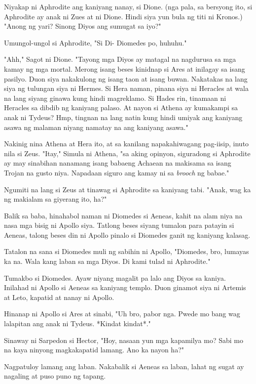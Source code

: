 \documentclass[12pt,letterpaper]{report}
\begin{document}
Niyakap ni Aphrodite ang kaniyang nanay, si Dione. (nga pala, sa bersyong ito, si Aphrodite ay anak ni Zues at ni Dione. Hindi siya yun bula ng titi ni Kronos.) "Anong ng yari? Sinong Diyos ang sumugat sa iyo?"

Umungol-ungol si Aphrodite, "Si Di- Diomedes po, huhuhu."

"Ahh," Sagot ni Dione. "Tayong mga Diyos ay matagal na nagdurusa sa mga kamay ng mga mortal. Merong isang beses kinidnap si Ares at inilagay sa isang pasilyo. Duon siya nakakulong ng isang taon at isang buwan. Nakatakas na lang siya ng tulungan siya ni Hermes. Si Hera naman, pinana siya ni Heracles at wala na lang siyang ginawa kung hindi magreklamo. Si Hades rin, tinamaan ni Heracles sa dibdib ng kaniyang palaso. At nayon si Athena ay kumakampi sa anak ni Tydeus? Hmp, tingnan na lang natin kung hindi umiyak ang kaniyang asawa ng malaman niyang namatay na ang kaniyang asawa."

Nakinig nina Athena at Hera ito, at sa kanilang napakahiwagang pag-iisip, inuto nila si Zeus. "Itay," Simula ni Athena, "sa aking opinyon, siguradong si Aphrodite ay may sinabihan nanamang isang babaeng Achaean na makisama sa isang Trojan na gusto niya. Napadaan siguro ang kamay ni sa \textit{brooch} ng babae."

Ngumiti na lang si Zeus at tinawag si Aphrodite sa kaniyang tabi. "Anak, wag ka ng makialam sa giyerang ito, ha?"

Balik sa baba, hinahabol naman ni Diomedes si Aeneas, kahit na alam niya na nasa mga bisig ni Apollo siya. Tatlong beses siyang tumalon para patayin si Aeneas, talong beses din ni Apollo pinalo si Diomedes ganit ng kaniyang kalasag.

Tatalon na sana si Diomedes muli ng sabihin ni Apollo, "Diomedes, bro, lumayas ka na. Wala kang laban sa mga Diyos. Di kami tulad ni Aphrodite."

Tumakbo si Diomedes. Ayaw niyang magalit pa lalo ang Diyos sa kaniya. Inilahad ni Apollo si Aeneas sa kaniyang templo. Duon ginamot siya ni Artemis at Leto, kapatid at nanay ni Apollo.

Hinanap ni Apollo si Ares at sinabi, "Uh bro, pabor nga. Pwede mo bang wag lalapitan ang anak ni Tydeus. *Kindat kindat*."

Sinaway ni Sarpedon si Hector, "Hoy, nasaan yun mga kapamilya mo? Sabi mo na kaya ninyong magkakapatid lamang. Ano ka nayon ha?"

Nagpatuloy lamang ang laban. Nakabalik si Aeneas sa laban, lahat ng sugat ay nagaling at puso puno ng tapang.
\end{document}
